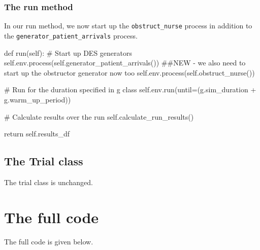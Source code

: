 \documentclass[
  letterpaper,
  DIV=11,
  numbers=noendperiod]{scrreprt}
\newenvironment{Shaded}{}{}
\newcommand{\CommentTok}[1]{\textcolor[rgb]{0.42,0.45,0.49}{#1}}
\newcommand{\ControlFlowTok}[1]{\textcolor[rgb]{0.84,0.23,0.29}{#1}}
\newcommand{\KeywordTok}[1]{\textcolor[rgb]{0.84,0.23,0.29}{#1}}
\newcommand{\NormalTok}[1]{\textcolor[rgb]{0.14,0.16,0.18}{#1}}
\newcommand{\OperatorTok}[1]{\textcolor[rgb]{0.14,0.16,0.18}{#1}}
\newcommand{\VariableTok}[1]{\textcolor[rgb]{0.89,0.38,0.04}{#1}}
\begin{document}
\subsubsection{The run method}\label{the-run-method-2}

In our run method, we now start up the \texttt{obstruct\_nurse} process
in addition to the \texttt{generator\_patient\_arrivals} process.

\begin{Shaded}
\begin{Highlighting}[]
\KeywordTok{def}\NormalTok{ run(}\VariableTok{self}\NormalTok{):}
    \CommentTok{\# Start up DES generators}
    \VariableTok{self}\NormalTok{.env.process(}\VariableTok{self}\NormalTok{.generator\_patient\_arrivals())}
    \CommentTok{\#\#NEW {-} we also need to start up the obstructor generator now too}
    \VariableTok{self}\NormalTok{.env.process(}\VariableTok{self}\NormalTok{.obstruct\_nurse())}

    \CommentTok{\# Run for the duration specified in g class}
    \VariableTok{self}\NormalTok{.env.run(until}\OperatorTok{=}\NormalTok{(g.sim\_duration }\OperatorTok{+}\NormalTok{ g.warm\_up\_period))}

    \CommentTok{\# Calculate results over the run}
    \VariableTok{self}\NormalTok{.calculate\_run\_results()}

    \ControlFlowTok{return} \VariableTok{self}\NormalTok{.results\_df}
\end{Highlighting}
\end{Shaded}

\subsection{The Trial class}\label{the-trial-class-3}

The trial class is unchanged.

\section{The full code}\label{the-full-code-1}

The full code is given below.
\end{document}
